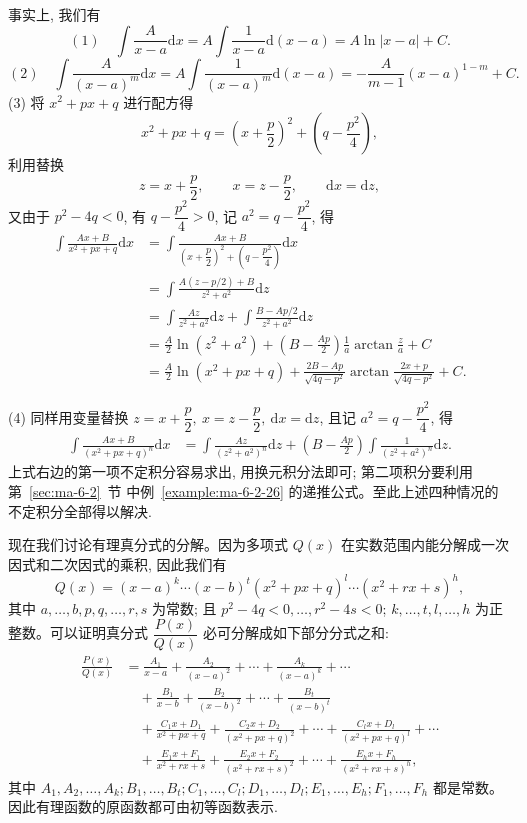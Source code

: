 事实上, 我们有
\[
  (1)\quad
  \int\frac A{x-a}\mathrm dx
  =
  A\int\frac1{x-a}\mathrm d(x-a)
  =
  A\ln|x-a|+C.
\]
\[
  (2)\quad
  \int\frac A{(x-a)^m}\mathrm dx
  =
  A\int\frac1{(x-a)^m}\mathrm d(x-a)
  =
  -\frac A{m-1}(x-a)^{1-m}+C.
\]
(3) 将 $x^2+px+q$ 进行配方得
\[
  x^2+px+q=\left(x+\frac p2\right)^2+\left(q-\frac{p^2}4\right),
\]
利用替换
\[
  z=x+\frac p2,\qquad x=z-\frac p2,\qquad \mathrm dx=\mathrm dz,
\]
又由于 $p^2-4q<0$, 有 $q-\dfrac{p^2}4>0$, 记 $a^2=q-\dfrac{p^2}4$, 得
\[
\begin{aligned}
  \int\frac{Ax+B}{x^2+px+q}\mathrm dx
  &=
  \int\frac{Ax+B}{\left(x+\dfrac p2\right)^2+\left(q-\dfrac{p^2}4\right)}\mathrm dx\\
  &=
  \int\frac{A(z-p/2)+B}{z^2+a^2}\mathrm dz\\
  &=
  \int\frac{Az}{z^2+a^2}\mathrm dz+
  \int\frac{B-Ap/2}{z^2+a^2}\mathrm dz\\
  &=
  \frac A2\ln(z^2+a^2)+\left(B-\frac{Ap}2\right)\frac1a\arctan\frac za+C\\
  &=
  \frac A2\ln(x^2+px+q)+
  \frac{2B-Ap}{\sqrt{4q-p^2}}\arctan\frac{2x+p}{\sqrt{4q-p^2}}+C.
\end{aligned}
\]

(4) 同样用变量替换 $z=x+\dfrac p2,\ x=z-\dfrac p2,\ \mathrm dx=\mathrm dz$, 且记 $a^2=q-\dfrac{p^2}4$, 得
\[
\begin{aligned}
  \int\frac{Ax+B}{(x^2+px+q)^n}\mathrm dx
  &=
  \int\frac{Az}{(z^2+a^2)^n}\mathrm dz+
  \left(B-\frac{Ap}2\right)\int\frac1{(z^2+a^2)^n}\mathrm dz.
\end{aligned}
\]
上式右边的第一项不定积分容易求出, 用换元积分法即可; 第二项积分要利用 第~\ref{sec:ma-6-2}~节 中例~\ref{example:ma-6-2-26} 的递推公式。至此上述四种情况的不定积分全部得以解决.

现在我们讨论有理真分式的分解。因为多项式 $Q(x)$ 在实数范围内能分解成一次因式和二次因式的乘积, 因此我们有
\[
  Q(x)=(x-a)^k\cdots(x-b)^t(x^2+px+q)^l\cdots(x^2+rx+s)^h,
\]
其中 $a,\ldots,b,p,q,\ldots,r,s$ 为常数; 且 $p^2-4q<0,\ldots,r^2-4s<0$; $k,\ldots,t,l,\ldots,h$ 为正整数。可以证明真分式 $\dfrac{P(x)}{Q(x)}$ 必可分解成如下部分分式之和:
\[
\begin{aligned}
  \frac{P(x)}{Q(x)}
  &=
  \frac{A_1}{x-a}+\frac{A_2}{(x-a)^2}+\cdots+\frac{A_k}{(x-a)^k}+\cdots\\
  &\quad+
  \frac{B_1}{x-b}+\frac{B_2}{(x-b)^2}+\cdots+\frac{B_t}{(x-b)^t}\\
  &\quad+
  \frac{C_1x+D_1}{x^2+px+q}+\frac{C_2x+D_2}{(x^2+px+q)^2}
  +\cdots+\frac{C_lx+D_l}{(x^2+px+q)^l}+\cdots\\
  &\quad+
  \frac{E_1x+F_1}{x^2+rx+s}+\frac{E_2x+F_2}{(x^2+rx+s)^2}
  +\cdots+\frac{E_hx+F_h}{(x^2+rx+s)^h},
\end{aligned}
\]
其中 $A_1,A_2,\ldots,A_k; B_1,\ldots,B_t; C_1,\ldots,C_l; D_1,\ldots,D_l; E_1,\ldots,E_h; F_1,\ldots,F_h$ 都是常数。因此有理函数的原函数都可由初等函数表示.

